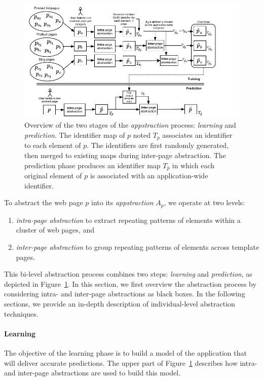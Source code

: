 \begin{figure}[ht]
  \centering
  \includegraphics[width=0.8\linewidth]{appstract/explanations/appstract_overview}
  \caption{Overview of the two stages of the \emph{appstraction} process: \emph{learning} and \emph{prediction}. The identifier map of $p$ noted $T_p$ associates an identifier to each element of $p$. The identifiers are first randomly generated, then merged to existing maps during inter-page abstraction. The prediction phase produces an identifier map $T_{\hat{p}}$ in which each original element of $p$ is associated with an application-wide identifier.}
  \label{fig:appstract_overview}
\end{figure}

To abstract the web page $p$ into its \emph{appstraction} $A_p$, we operate at two levels:
\begin{enumerate}
  \item \textit{intra-page abstraction} to extract repeating patterns of elements within a cluster of web pages, and
  \item \textit{inter-page abstraction} to group repeating patterns of elements across template pages.
\end{enumerate}

This bi-level abstraction process combines two steps: \emph{learning} and \emph{prediction}, as depicted in Figure~\ref{fig:appstract_overview}.
% 
In this section, we first overview the abstraction process by considering intra- and inter-page abstractions as black boxes. 
In the following sections, we provide an in-depth description of individual-level abstraction techniques.

\paragraph{Learning}
The objective of the learning phase is to build a model of the application that will deliver accurate predictions.
The upper part of Figure~\ref{fig:appstract_overview} describes how intra- and inter-page abstractions are used to build this model.

